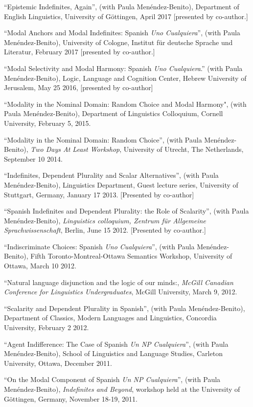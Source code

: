 \documentclass[11pt]{article}
\begin{document}
``Epistemic Indefinites, Again'', (with Paula Men\'endez-Benito), Department of English Linguistics, University of G\"{o}ttingen, April 2017 [presented by co-author.]

``Modal Anchors and Modal Indefinites: Spanish \textit{Uno Cualquiera}'', (with Paula Men\'endez-Benito), University of Cologne, Institut f\"ur deutsche Sprache und Literatur, February 2017 [presented by co-author.]

``Modal Selectivity and Modal Harmony: Spanish \textit{Uno Cualquiera}.'' (with Paula Men\'endez-Benito), Logic, Language and Cognition Center, Hebrew University of Jerusalem, May 25 2016, [presented by co-author]

``Modality in the Nominal Domain: Random Choice and Modal Harmony", (with Paula Men\'endez-Benito), Department of Linguistics Colloquium, Cornell University, February 5, 2015.

``Modality in the Nominal Domain: Random Choice'',
(with Paula Men\'endez-Benito), \textit{Two Days At Least Workshop},
University of Utrecht, The Netherlands, September 10 2014.

``Indefinites, Dependent Plurality and Scalar
Alternatives'', (with Paula Men\'endez-Benito), Linguistics Department, Guest lecture series, University of Stuttgart, Germany, January 17 2013. [Presented by co-author]

``Spanish Indefinites and Dependent Plurality: the Role of
Scalarity'',  (with Paula Men\'endez-Benito), \textit{Linguistics colloquium, Zentrum f\"{u}r
  Allgemeine Sprachwissenschaft}, Berlin, June 15 2012. [Presented by co-author.]

``Indiscriminate Choices: Spanish \textit{Uno
  Cualquiera}'', (with Paula Men\'endez-Benito), Fifth Toronto-Montreal-Ottawa Semantics Workshop, University of
Ottawa, March 10 2012.

``Natural language disjunction and the logic of our
minds:, \textit{McGill Canadian Conference for Linguistics
  Undergraduates}, McGill University, March 9, 2012.

``Scalarity and Dependent Plurality in Spanish'', (with Paula Men\'endez-Benito),
Department of Classics, Modern Languages and Linguistics, Concordia
University, February 2 2012.

``Agent Indifference: The Case of Spanish \textit{Un NP
  Cualquiera}'', (with Paula Men\'endez-Benito), School of Linguistics and Language Studies, Carleton
University, Ottawa, December 2011. 

``On the Modal Component of Spanish \textit{Un NP
  Cualquiera}'', (with Paula Men\'endez-Benito), \textit{Indefinites
  and Beyond}, workshop held at the University of G\"{o}ttingen,
Germany, November 18-19, 2011.
\end{document}
